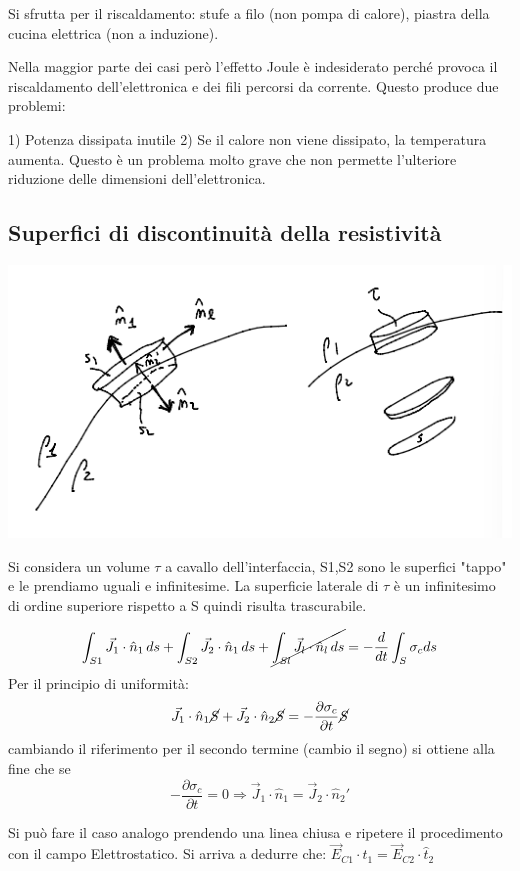 Si sfrutta per il riscaldamento: stufe a filo (non pompa di calore), piastra della cucina elettrica (non a induzione).

Nella maggior parte dei casi però l'effetto Joule è indesiderato perché provoca il riscaldamento dell'elettronica e dei fili percorsi da corrente. Questo produce due problemi:

1) Potenza dissipata inutile
2) Se il calore non viene dissipato, la temperatura aumenta. Questo è un problema molto grave che non permette l'ulteriore riduzione delle dimensioni dell'elettronica.

\subsection{Superfici di discontinuità della resistività}
\begin{center}
    \includegraphics[scale = 0.6]{immagini/image12.png}
\end{center}
Si considera un volume $\tau$ a cavallo dell'interfaccia, S1,S2 sono le superfici "tappo" e le prendiamo uguali e infinitesime. La superficie laterale di $\tau$ è un infinitesimo di ordine superiore rispetto a S quindi risulta trascurabile.

\[
\int_{S1} \vec{J_1}\cdot\hat{n}_1 \, ds + \int_{S2} \vec{J_2}\cdot\hat{n}_1 \, ds + \cancel{\int_{Sl} \vec{J_l}\cdot\hat{n}_l \, ds} = -\frac{d}{dt}\int_S\sigma_cds
\]     
Per il principio di uniformità:
\[
    \vec{J}_1\cdot\hat{n}_1\cancel S + \vec{J}_2\cdot\hat{n}_2\cancel S = -\frac{\partial \sigma_c}{\partial t}\cancel S
\]
cambiando il riferimento per il secondo termine (cambio il segno) si ottiene alla fine che se
\[
-\frac{\partial \sigma_c}{\partial t} = 0 \Rightarrow \vec{J}_1\cdot\hat{n}_1 = \vec{J}_2\cdot\hat{n}_2'
\]

Si può fare il caso analogo prendendo una linea chiusa e ripetere il procedimento con il campo Elettrostatico. Si arriva a dedurre che: $\vec{E}_{C1} \cdot \hat{t}_1 = \vec{E}_{C2} \cdot \hat{t}_2$